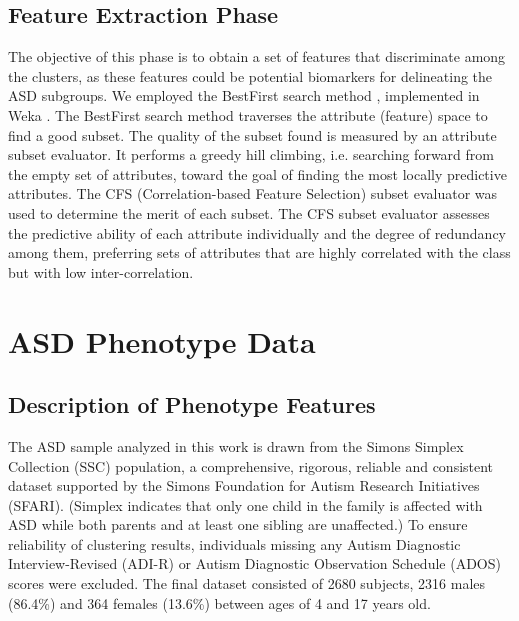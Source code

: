 \documentclass{bmcart}
\begin{document}
\subsection*{Feature Extraction Phase}

The objective of this phase is to obtain a set of features that discriminate among the clusters, as these features could be potential biomarkers for delineating the ASD subgroups. 
We employed the BestFirst search method \cite{eibe2016weka}, implemented in  Weka \cite{hall2009weka}. The BestFirst search method traverses the attribute (feature) space to find a good subset. The quality of the subset found is measured by an attribute subset evaluator.  It performs a greedy hill climbing, i.e. searching forward from the empty set of attributes, toward the goal of finding the most locally predictive attributes. The CFS (Correlation-based Feature Selection) subset evaluator was used to determine the merit of each subset.  The CFS subset evaluator \cite{frank2016weka} assesses the predictive ability of each attribute individually and the degree of redundancy among them, preferring sets of attributes that are highly correlated with the class but with low inter-correlation.  


\section*{ASD Phenotype Data}

\subsection*{Description of Phenotype Features}

The ASD sample analyzed in this work is drawn from the Simons Simplex Collection (SSC) \cite{fischbach2010simons} population, a comprehensive, rigorous, reliable and consistent dataset supported by the Simons Foundation for Autism Research Initiatives (SFARI). (Simplex indicates that only one child in the family is affected with ASD while both parents and at least one sibling are unaffected.) To ensure reliability of clustering results, individuals missing any Autism Diagnostic Interview-Revised (ADI-R) \cite{lord1994autism} or Autism Diagnostic Observation Schedule (ADOS) \cite{lord1989austism} scores were excluded. The final dataset consisted of 2680 subjects, 2316 males (86.4\%) and 364 females (13.6\%) between ages of 4 and 17 years old. 
\end{document}
